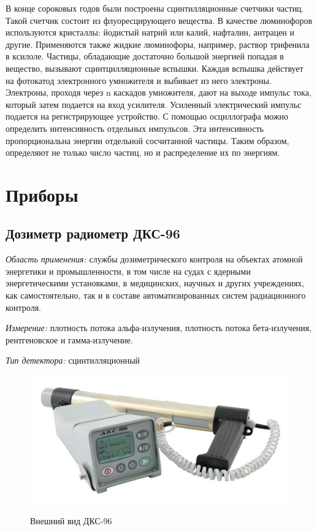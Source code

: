\documentclass[14pt,pscyr,titlepage]{hedreport}
\begin{document}
		В конце сороковых годов были построены сцинтилляционные счетчики частиц. 
		Такой счетчик состоит из флуоресцирующего вещества. В качестве 
		люминофоров используются кристаллы: йодистый натрий или калий, 
		нафталин, антрацен и другие. Применяются также жидкие люминофоры, 
		например, раствор трифенила в ксилоле. Частицы, обладающие достаточно 
		большой энергией попадая в вещество, вызывают сцинтцилляционные 
		вспышки. Каждая вспышка действует на фотокатод электронного умножителя 
		и выбивает из него электроны. Электроны, проходя через n каскадов 
		умножителя, дают на выходе импульс тока, который затем подается на 
		вход усилителя. Усиленный электрический импульс подается на 
		регистрирующее устройство. С помощью осциллографа можно определить 
		интенсивность отдельных импульсов. Эта интенсивность пропорциональна 
		энергии отдельной сосчитанной частицы. Таким образом, определяют не 
		только число частиц, но и распределение их по энергиям. 

	\pagebreak

	\section{Приборы}
	\subsection{Дозиметр радиометр ДКС-96}
		\emph{Область применения:} службы дозиметрического контроля на объектах 
		атомной энергетики и промышленности, в том числе на судах с ядерными 
		энергетическими установками, в медицинских, научных и других 
		учреждениях, как самостоятельно, так и в составе автоматизированных 
		систем радиационного контроля.
		
		\emph{Измерение:} плотность потока альфа-излучения, плотность потока 
			бета-излучения, рентгеновское и гамма-излучение. 

		\emph{Тип детектора:} сцинтилляционный

		\begin{figure}[h!]
			\center
			\includegraphics[width=.8\textwidth]{DKS-96} \\
			\caption{Внешний вид ДКС-96}
		\end{figure}
\end{document}

